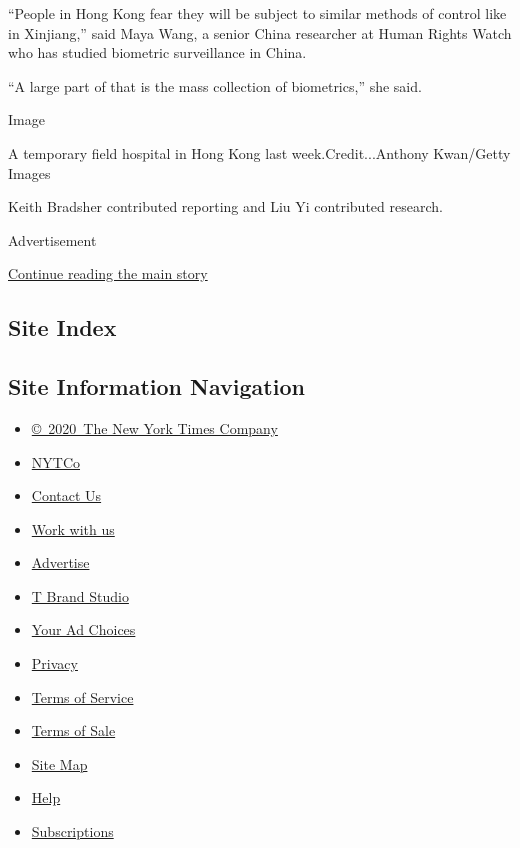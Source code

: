 ``People in Hong Kong fear they will be subject to similar methods of
control like in Xinjiang,'' said Maya Wang, a senior China researcher at
Human Rights Watch who has studied biometric surveillance in China.

``A large part of that is the mass collection of biometrics,'' she said.

Image

A temporary field hospital in Hong Kong last week.Credit...Anthony
Kwan/Getty Images

Keith Bradsher contributed reporting and Liu Yi contributed research.

Advertisement

\protect\hyperlink{after-bottom}{Continue reading the main story}

\hypertarget{site-index}{%
\subsection{Site Index}\label{site-index}}

\hypertarget{site-information-navigation}{%
\subsection{Site Information
Navigation}\label{site-information-navigation}}

\begin{itemize}
\tightlist
\item
  \href{https://help.nytimes.com/hc/en-us/articles/115014792127-Copyright-notice}{©~2020~The
  New York Times Company}
\end{itemize}

\begin{itemize}
\tightlist
\item
  \href{https://www.nytco.com/}{NYTCo}
\item
  \href{https://help.nytimes.com/hc/en-us/articles/115015385887-Contact-Us}{Contact
  Us}
\item
  \href{https://www.nytco.com/careers/}{Work with us}
\item
  \href{https://nytmediakit.com/}{Advertise}
\item
  \href{http://www.tbrandstudio.com/}{T Brand Studio}
\item
  \href{https://www.nytimes.com/privacy/cookie-policy\#how-do-i-manage-trackers}{Your
  Ad Choices}
\item
  \href{https://www.nytimes.com/privacy}{Privacy}
\item
  \href{https://help.nytimes.com/hc/en-us/articles/115014893428-Terms-of-service}{Terms
  of Service}
\item
  \href{https://help.nytimes.com/hc/en-us/articles/115014893968-Terms-of-sale}{Terms
  of Sale}
\item
  \href{https://spiderbites.nytimes.com}{Site Map}
\item
  \href{https://help.nytimes.com/hc/en-us}{Help}
\item
  \href{https://www.nytimes.com/subscription?campaignId=37WXW}{Subscriptions}
\end{itemize}
